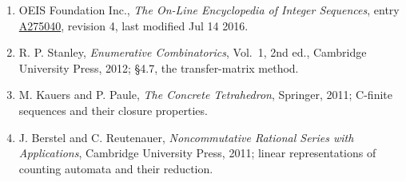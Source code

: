 \documentclass[11pt]{article}
\theoremstyle{definition}
\begin{document}
\begin{enumerate}

\item OEIS Foundation Inc., \emph{The On-Line Encyclopedia of Integer Sequences}, entry \href{https://oeis.org/A275040}{A275040}, revision 4, last modified Jul 14 2016.

\item R. P. Stanley, \emph{Enumerative Combinatorics}, Vol.~1, 2nd ed., Cambridge University Press, 2012; \S4.7, the transfer-matrix method.

\item M. Kauers and P. Paule, \emph{The Concrete Tetrahedron}, Springer, 2011; C-finite sequences and their closure properties.

\item J. Berstel and C. Reutenauer, \emph{Noncommutative Rational Series with Applications}, Cambridge University Press, 2011; linear representations of counting automata and their reduction.

\end{enumerate}
\end{document}
